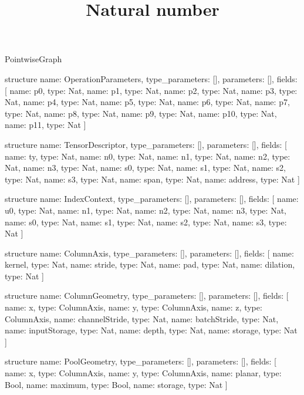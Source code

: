 \begin{lexlean}{PointwiseGraph}
\title{Natural number}
\begin{semanticmodule}
structure{
  name: OperationParameters,
  type_parameters: [],
  parameters: [],
  fields: [
    {name: p0, type: Nat},
    {name: p1, type: Nat},
    {name: p2, type: Nat},
    {name: p3, type: Nat},
    {name: p4, type: Nat},
    {name: p5, type: Nat},
    {name: p6, type: Nat},
    {name: p7, type: Nat},
    {name: p8, type: Nat},
    {name: p9, type: Nat},
    {name: p10, type: Nat},
    {name: p11, type: Nat}
  ]
}

structure{
  name: TensorDescriptor,
  type_parameters: [],
  parameters: [],
  fields: [
    {name: ty, type: Nat},
    {name: n0, type: Nat},
    {name: n1, type: Nat},
    {name: n2, type: Nat},
    {name: n3, type: Nat},
    {name: s0, type: Nat},
    {name: s1, type: Nat},
    {name: s2, type: Nat},
    {name: s3, type: Nat},
    {name: span, type: Nat},
    {name: address, type: Nat}
  ]
}

structure{
  name: IndexContext,
  type_parameters: [],
  parameters: [],
  fields: [
    {name: u0, type: Nat},
    {name: n1, type: Nat},
    {name: n2, type: Nat},
    {name: n3, type: Nat},
    {name: s0, type: Nat},
    {name: s1, type: Nat},
    {name: s2, type: Nat},
    {name: s3, type: Nat}
  ]
}

structure{
  name: ColumnAxis,
  type_parameters: [],
  parameters: [],
  fields: [
    {name: kernel, type: Nat},
    {name: stride, type: Nat},
    {name: pad, type: Nat},
    {name: dilation, type: Nat}
  ]
}

structure{
  name: ColumnGeometry,
  type_parameters: [],
  parameters: [],
  fields: [
    {name: x, type: ColumnAxis},
    {name: y, type: ColumnAxis},
    {name: z, type: ColumnAxis},
    {name: channelStride, type: Nat},
    {name: batchStride, type: Nat},
    {name: inputStorage, type: Nat},
    {name: depth, type: Nat},
    {name: storage, type: Nat}
  ]
}

structure{
  name: PoolGeometry,
  type_parameters: [],
  parameters: [],
  fields: [
    {name: x, type: ColumnAxis},
    {name: y, type: ColumnAxis},
    {name: planar, type: Bool},
    {name: maximum, type: Bool},
    {name: storage, type: Nat}
  ]
}


\end{semanticmodule}
\end{lexlean}

